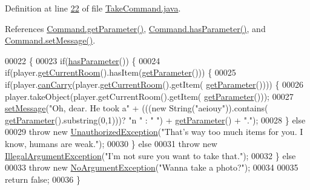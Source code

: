 Definition at line \hyperlink{TakeCommand_8java_source_l00022}{22} of file \hyperlink{TakeCommand_8java_source}{Take\-Command.\-java}.



References \hyperlink{Command_8java_source_l00025}{Command.\-get\-Parameter()}, \hyperlink{Command_8java_source_l00041}{Command.\-has\-Parameter()}, and \hyperlink{Command_8java_source_l00049}{Command.\-set\-Message()}.


\begin{DoxyCode}
00022                                                                                                            
               \{
00023         \textcolor{keywordflow}{if}(\hyperlink{classCommand_a9b042558156d6749566e0fd9d48d3bfe}{hasParameter}()) \{
00024             \textcolor{keywordflow}{if}(player.\hyperlink{classPlayer_a3a3107df50fc4e35e8c0f46c3f776ce6}{getCurrentRoom}().hasItem(\hyperlink{classCommand_a1ced3739d546770ba1389e6ce228255e}{getParameter}())) \{
00025                 \textcolor{keywordflow}{if}(player.\hyperlink{classPlayer_ad84aab6c7b6ed8d58608adf0484f0268}{canCarry}(player.\hyperlink{classPlayer_a3a3107df50fc4e35e8c0f46c3f776ce6}{getCurrentRoom}().getItem(
      \hyperlink{classCommand_a1ced3739d546770ba1389e6ce228255e}{getParameter}()))) \{
00026                     player.takeObject(player.getCurrentRoom().getItem(
      \hyperlink{classCommand_a1ced3739d546770ba1389e6ce228255e}{getParameter}()));
00027                     \hyperlink{classCommand_a715709d8f0ab65879d79ad1725c96f17}{setMessage}(\textcolor{stringliteral}{"Oh, dear. He took a"} + (((\textcolor{keyword}{new} String(\textcolor{stringliteral}{"aeiouy"})).contains(
      \hyperlink{classCommand_a1ced3739d546770ba1389e6ce228255e}{getParameter}().substring(0,1)))? \textcolor{stringliteral}{"n "} : \textcolor{stringliteral}{" "}) + \hyperlink{classCommand_a1ced3739d546770ba1389e6ce228255e}{getParameter}() + \textcolor{stringliteral}{"."});
00028                 \} \textcolor{keywordflow}{else}
00029                     \textcolor{keywordflow}{throw} \textcolor{keyword}{new} \hyperlink{classUnauthorizedException}{UnauthorizedException}(\textcolor{stringliteral}{"That's way too much items for
       you. I know, humans are weak."});
00030             \} \textcolor{keywordflow}{else}
00031                 \textcolor{keywordflow}{throw} \textcolor{keyword}{new} \hyperlink{classIllegalArgumentException}{IllegalArgumentException}(\textcolor{stringliteral}{"I'm not sure you want to take
       that."});
00032         \} \textcolor{keywordflow}{else}
00033             \textcolor{keywordflow}{throw} \textcolor{keyword}{new} \hyperlink{classNoArgumentException}{NoArgumentException}(\textcolor{stringliteral}{"Wanna take a photo?"});
00034 
00035         \textcolor{keywordflow}{return} \textcolor{keyword}{false};
00036     \}
\end{DoxyCode}


